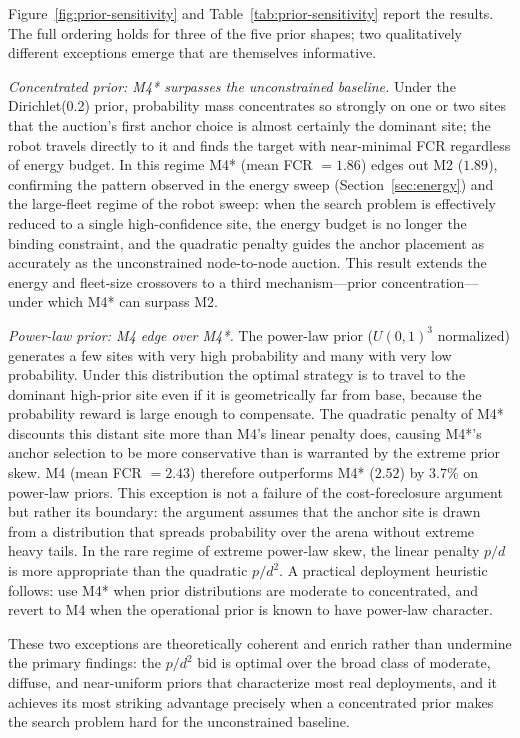 Figure~\ref{fig:prior-sensitivity} and Table~\ref{tab:prior-sensitivity}
report the results. The full ordering holds for three of the five prior
shapes; two qualitatively different exceptions emerge that are themselves
informative.

\emph{Concentrated prior: M4* surpasses the unconstrained baseline.}
Under the Dirichlet(0.2) prior, probability mass concentrates so strongly
on one or two sites that the auction's first anchor choice is almost
certainly the dominant site; the robot travels directly to it and finds
the target with near-minimal FCR regardless of energy budget.
In this regime M4* (mean FCR $= 1.86$) edges out M2 ($1.89$), confirming
the pattern observed in the energy sweep (Section~\ref{sec:energy}) and
the large-fleet regime of the robot sweep: when the search problem is
effectively reduced to a single high-confidence site, the energy budget
is no longer the binding constraint, and the quadratic penalty guides the
anchor placement as accurately as the unconstrained node-to-node auction.
This result extends the energy and fleet-size crossovers to a third
mechanism---prior concentration---under which M4* can surpass M2.

\emph{Power-law prior: M4 edge over M4*.}
The power-law prior ($U(0,1)^3$ normalized) generates a few sites with
very high probability and many with very low probability.
Under this distribution the optimal strategy is to travel to the dominant
high-prior site even if it is geometrically far from base, because the
probability reward is large enough to compensate.
The quadratic penalty of M4* discounts this distant site more than M4's
linear penalty does, causing M4*'s anchor selection to be more
conservative than is warranted by the extreme prior skew.
M4 (mean FCR $= 2.43$) therefore outperforms M4* ($2.52$) by $3.7\%$
on power-law priors.
This exception is not a failure of the cost-foreclosure argument but
rather its boundary: the argument assumes that the anchor site is drawn
from a distribution that spreads probability over the arena without
extreme heavy tails.
In the rare regime of extreme power-law skew, the linear penalty $p/d$
is more appropriate than the quadratic $p/d^2$.
A practical deployment heuristic follows: use M4* when prior distributions
are moderate to concentrated, and revert to M4 when the operational prior
is known to have power-law character.

These two exceptions are theoretically coherent and enrich rather than
undermine the primary findings: the $p/d^2$ bid is optimal over the broad
class of moderate, diffuse, and near-uniform priors that characterize most
real deployments, and it achieves its most striking advantage precisely
when a concentrated prior makes the search problem hard for the
unconstrained baseline.
